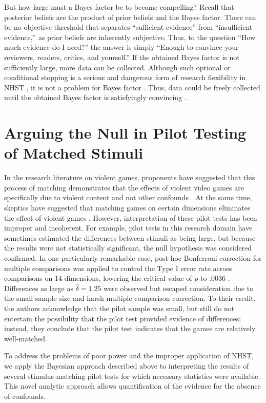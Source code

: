 \documentclass[man]{apa6}
\begin{document}
But how large must a Bayes factor be to become compelling? Recall that posterior beliefs are the product of prior beliefs and the Bayes factor. There can be no objective threshold that separates ``sufficient evidence'' from ``insufficient evidence,'' as prior beliefs are inherently subjective. Thus, to the question ``How much evidence do I need?'' the answer is simply ``Enough to convince your reviewers, readers, critics, and yourself.'' 
If the obtained Bayes factor is not sufficiently large, more data can be collected. Although such optional or conditional stopping is a serious and dangerous form of research flexibility in NHST \citep{Simmons:etal:2011}, it is not a problem for Bayes factor \citep{Dienes:2011,Rouder:2014}. 
Thus, data could be freely collected until the obtained Bayes factor is satisfyingly convincing \citep[e.g.,][]{Matzke:etal:2015}.

\section{Arguing the Null in Pilot Testing of Matched Stimuli}
In the research literature on violent games, proponents have suggested that this process of matching demonstrates that the effects of violent video games are specifically due to violent content and not other confounds \citep{Anderson:etal:2004}. At the same time, skeptics have suggested that matching games on certain dimensions eliminates the effect of violent games \citep{Adachi:Willoughby:2011}. However, interpretation of these pilot tests has been improper and incoherent. For example, pilot tests in this research domain have sometimes estimated the differences between stimuli as being large, but because the results were not statistically significant, the null hypothesis was considered confirmed. In one particularly remarkable case, post-hoc Bonferroni correction for multiple comparisons was applied to control the Type I error rate across comparisons on 14 dimensions, lowering the critical value of $p$ to .0036 \citep{Arriaga:etal:2008}. Differences as large as $\hat{\delta} = 1.25$ were observed but escaped consideration due to the small sample size and harsh multiple comparison correction. To their credit, the authors acknowledge that the pilot sample was small, but still do not entertain the possibility that the pilot test provided evidence of differences; instead, they conclude that the pilot test indicates that the games are relatively well-matched.

To address the problems of poor power and the improper application of NHST, we apply the Bayesian approach described above to interpreting the results of several stimulus-matching pilot tests for which necessary statistics were available. This novel analytic approach allows quantification of the evidence for the absence of confounds. 
\end{document}
